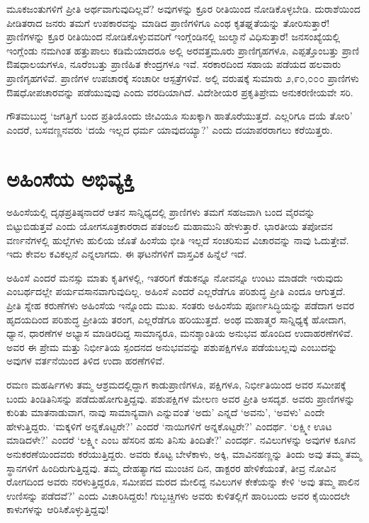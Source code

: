 ಮೂಕಜಂತುಗಳಿಗೆ ಪ್ರೀತಿ ಅರ್ಥವಾಗುವುದಿಲ್ಲವೆ? ಅವುಗಳನ್ನು ಕ್ರೂರ ರೀತಿಯಿಂದ ನೋಡಿಕೊಳ್ಳಬೇಡಿ. ದುರಾಶೆಯಿಂದ ಪೀಡಿತರಾದ ಜನರು ತಮಗೆ ಉಪಕಾರವನ್ನು ಮಾಡಿದ ಪ್ರಾಣಿಗಳಿಗೂ ಎಂಥ ಕೃತಘ್ನತೆಯನ್ನು ತೋರಿಸುತ್ತಾರೆ! ಪ್ರಾಣಿಗಳನ್ನು ಕ್ರೂರ ರೀತಿಯಿಂದ ನೋಡಿಕೊಳ್ಳುವವರಿಗೆ ಇಂಗ್ಲೆಂಡಿನಲ್ಲಿ ಜುಲ್ಮಾನೆ ವಿಧಿಸುತ್ತಾರೆ! ಜನಸಂಖ್ಯೆಯಲ್ಲಿ ಇಂಗ್ಲೆಂಡು ನಮಗಿಂತ ಹತ್ತುಪಾಲು ಕಡಿಮೆಯಾದರೂ ಅಲ್ಲಿ ಅರವತ್ತಮೂರು ಪ್ರಾಣಿಗೃಹಗಳೂ, ಎಪ್ಪತ್ತೊಂಬತ್ತು ಪ್ರಾಣಿ ಔಷಧಾಲಯಗಳೂ, ನೂರೆಂಬತ್ತು ಪ್ರಾಣಿಹಿತ ಕೇಂದ್ರಗಳೂ ಇವೆ. ಸರಕಾರದಿಂದ ಸಹಾಯ ಪಡೆಯದ ಹಲವಾರು ಪ್ರಾಣಿಗೃಹಗಳಿವೆ. ಪ್ರಾಣಿಗಳ ಉಪಚಾರಕ್ಕೆ ಸಂಚಾರೀ ಆಸ್ಪತ್ರೆಗಳಿವೆ. ಅಲ್ಲಿ ವರುಷಕ್ಕೆ ಸುಮಾರು ೨,೯೦,೦೦೦ ಪ್ರಾಣಿಗಳು ಔಷಧೋಪಚಾರವನ್ನು ಪಡೆಯುವುವು ಎಂದು ವರದಿಯಾಗಿದೆ. ವಿದೇಶೀಯರ ಪ್ರಕೃತಿಪ್ರೇಮ ಅನುಕರಣೀಯವೇ ಸರಿ.

ಗೌತಮಬುದ್ಧ ‘ಜಗತ್ತಿಗೆ ಬಂದ ಪ್ರತಿಯೊಂದು ಜೀವಿಯೂ ಸುಖಕ್ಕಾಗಿ ಹಾತೊರೆಯುತ್ತದೆ. ಎಲ್ಲರಿಗೂ ದಯೆ ತೋರಿ’ ಎಂದರೆ, ಬಸವಣ್ಣನವರು ‘ದಯೆ ಇಲ್ಲದ ಧರ್ಮ ಯಾವುದಯ್ಯಾ?’ ಎಂದು ದಯಾಪರರಾಗಲು ಕರೆಯಿತ್ತರು.


\section*{ಅಹಿಂಸೆಯ ಅಭಿವ್ಯಕ್ತಿ}


ಅಹಿಂಸೆಯಲ್ಲಿ ದೃಢಪ್ರತಿಷ್ಠನಾದರೆ ಆತನ ಸಾನ್ನಿಧ್ಯದಲ್ಲಿ ಪ್ರಾಣಿಗಳು ತಮಗೆ ಸಹಜವಾಗಿ ಬಂದ ವೈರವನ್ನು ಬಿಟ್ಟುಬಿಡುತ್ತವೆ ಎಂದು ಯೋಗಸೂತ್ರಕಾರರಾದ ಪತಂಜಲಿ ಮಹಾಮುನಿ ಹೇಳುತ್ತಾರೆ. ಭಾರತೀಯ ತಪೋವನ ವರ್ಣನೆಗಳಲ್ಲಿ ಹುಲ್ಲೆಗಳು ಹುಲಿಯ ಜೊತೆ ಹಿಂಸೆಯ ಭೀತಿ ಇಲ್ಲದೆ ಸಂಚರಿಸುವ ವಿಚಾರವನ್ನು ನಾವು ಓದುತ್ತೇವೆ. ಇದು ಕೇವಲ ಕವಿಕಲ್ಪನೆ ಎನ್ನಲಾಗದು. ಈ ಘಟನೆಗಳಿಗೆ ವಾಸ್ತವಿಕ ಹಿನ್ನೆಲೆ ಇದೆ.

ಅಹಿಂಸೆ ಎಂದರೆ ಮನಸ್ಸು ಮಾತು ಕೃತಿಗಳಲ್ಲಿ, ಇತರರಿಗೆ ಕೆಡುಕನ್ನೂ ನೋವನ್ನೂ ಉಂಟು ಮಾಡದೇ ಇರುವುದು ಎಂಬರ್ಥದಲ್ಲೇ ಪರ್ಯವಸಾನವಾಗುವುದಿಲ್ಲ. ಅಹಿಂಸೆ ಎಂದರೆ ಎಲ್ಲ\-ರೆಡೆಗೂ ಪರಿಶುದ್ಧ ಪ್ರೀತಿ ಎಂದೂ ಆಗುತ್ತದೆ. ಪ್ರೀತಿ ಸ್ನೇಹ ಕರುಣೆಗಳು ಅಹಿಂಸೆಯ ಇನ್ನೊಂದು ಮುಖ. ಸಂತರು ಅಹಿಂಸೆಯ ಪೂರ್ಣಸಿದ್ಧಿಯನ್ನು ಪಡೆದಾಗ ಅವರ ಹೃದಯದಿಂದ ಪರಿಶುದ್ಧ ಪ್ರೀತಿಯ ತರಂಗ, ಎಲ್ಲರೆಡೆಗೂ ಹರಿಯುತ್ತದೆ. ಅಂಥ ಮಹಾತ್ಮರ ಸಾನ್ನಿಧ್ಯಕ್ಕೆ ಹೋದಾಗ, ಧ್ಯಾನ, ಧಾರಣೆಗಳ ಅಭ್ಯಾಸ ಮಾಡಿರದಿದ್ದ ಸಾಮಾನ್ಯರೂ, ಮನಶ್ಶಾಂತಿಯ ಅನುಭವ ಹೊಂದಿದ ಉದಾಹರಣೆಗಳಿವೆ. ಅವರ ಈ ಪ್ರೇಮ ಮತ್ತು ನಿರ್ಭೀತಿಯ ಸ್ಪಂದನದ ಅನುಭವವನ್ನು ಪಶುಪಕ್ಷಿಗಳೂ ಪಡೆಯಬಲ್ಲವು ಎಂಬುದನ್ನು ಅವುಗಳ ವರ್ತನೆಯಿಂದ ತಿಳಿದ ಉದಾ ಹರಣೆಗಳಿವೆ.

ರಮಣ ಮಹರ್ಷಿಗಳು ತಮ್ಮ ಆಶ್ರಮದಲ್ಲಿದ್ದಾಗ ಕಾಡುಪ್ರಾಣಿಗಳೂ, ಪಕ್ಷಿಗಳೂ, ನಿರ್ಭೀತಿಯಿಂದ ಅವರ ಸಮೀಪಕ್ಕೆ ಬಂದು ತಿಂಡಿತಿನಿಸನ್ನು ಪಡೆದುಹೋಗುತ್ತಿದ್ದವು. ಪಶುಪಕ್ಷಿಗಳ ಮೇಲಣ ಅವರ ಪ್ರೀತಿ ಅಸದೃಶ. ಅವರು ಪ್ರಾಣಿಗಳನ್ನು ಕುರಿತು ಮಾತನಾಡುವಾಗ, ನಾವು ಸಾಮಾನ್ಯವಾಗಿ ಎನ್ನುವಂತೆ ‘ಅದು’ ಎನ್ನದೆ ‘ಅವನು’, ‘ಅವಳು’ ಎಂದೇ ಹೇಳುತ್ತಿದ್ದರು. ‘ಮಕ್ಕಳಿಗೆ ಅನ್ನಕೊಟ್ಟರೇ?’ ಎಂದರೆ ‘ನಾಯಿಗಳಿಗೆ ಅನ್ನಕೊಟ್ಟರೇ?’ ಎಂದರ್ಥ. ‘ಲಕ್ಷ್ಮೀ ಊಟ ಮಾಡಿದಳೇ?’ ಎಂದರೆ ‘ಲಕ್ಷ್ಮೀ ಎಂಬ ಹೆಸರಿನ ಹಸು ತಿನಿಸು ತಿಂದಿತೇ?’ ಎಂದರ್ಥ. ನವಿಲುಗಳನ್ನು ಅವುಗಳ ಕೂಗಿನ ಅನುಕರಣೆಯಿಂದವರು ಕರೆಯುತ್ತಿದ್ದರು. ಅವರು ಕೊಟ್ಟ ಬೇಳೆಕಾಳು, ಅಕ್ಕಿ, ಮಾವಿನಹಣ್ಣನ್ನು ತಿಂದು ಅವು ತಮ್ಮ ತಮ್ಮ ಸ್ಥಾನಗಳಿಗೆ ಹಿಂದಿರುಗುತ್ತಿದ್ದವು. ತಮ್ಮ ದೇಹತ್ಯಾಗದ ಮುಂಚಿನ ದಿನ, ಡಾಕ್ಟರರ ಹೇಳಿಕೆಯಂತೆ, ತೀವ್ರ ನೋವಿನ ರೋಗದಿಂದ ಅವರು ನರಳುತ್ತಿದ್ದರೂ, ಸಮೀಪದ ಮರದ ಮೇಲಿದ್ದ ನವಿಲುಗಳ ಕೇಕೆಯನ್ನು ಕೇಳಿ ‘ಅವು ತಮ್ಮ ಪಾಲಿನ ಉಣಿಸನ್ನು ಪಡೆದವೆ?’ ಎಂದು ವಿಚಾರಿಸಿದ್ದರು! ಗುಬ್ಬಚ್ಚಿಗಳು ಅವರು ಕುಳಿತಲ್ಲಿಗೆ ಹಾರಿಬಂದು ಅವರ ಕೈಯಿಂದಲೇ ಕಾಳುಗಳನ್ನು ಆರಿಸಿಕೊಳ್ಳುತ್ತಿದ್ದವು!

